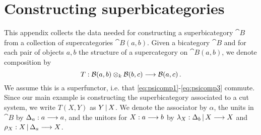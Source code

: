 \documentclass[english,letter paper,12pt,leqno]{article}
\theoremstyle{example}
\numberwithin{equation}{section}
\begin{document}
\section{Constructing superbicategories}\label{section:constructing_superbicategories}

This appendix collects the data needed for constructing a superbicategory $\cat{B}$ from a collection of supercategories $\cat{B}(a,b)$. Given a bicategory $\cat{B}$ and for each pair of objects $a,b$ the structure of a supercategory on $\cat{B}(a,b)$, we denote composition by
\[
T: \mathcal{B}(a, b) \otimes_k \mathcal{B}(b,c) \longrightarrow \mathcal{B}(a,c)\,.
\]
We assume this is a superfunctor, i.e. that \eqref{eq:psicomp1}-\eqref{eq:psicomp3} commute. Since our main example is constructing the superbicategory associated to a cut system, we write $T(X,Y)$ as $Y \,|\, X$. We denote the associator by $\alpha$, the units in $\cat{B}$ by $\Delta_a: a \longrightarrow a$, and the unitors for $X: a \longrightarrow b$ by $\lambda_X: \Delta_b \,|\, X \longrightarrow X$ and $\rho_X: X \,|\, \Delta_a \longrightarrow X$.
\end{document}
